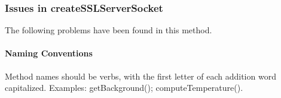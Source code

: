 

\subsubsection{Issues in createSSLServerSocket}
The following problems have been found in this method.

\paragraph{Naming Conventions}
\begin{itemize}
	Method names should be verbs, with the first letter of each addition word capitalized. Examples: getBackground(); computeTemperature().
\end{itemize}

